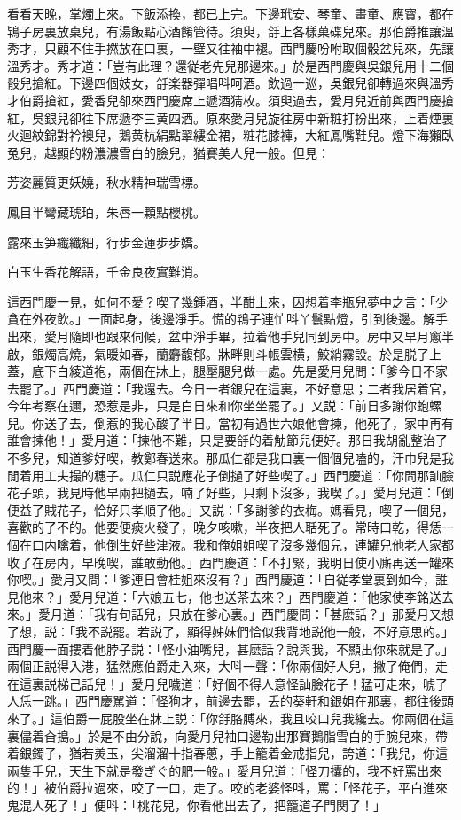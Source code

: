 看看天晚，掌燭上來。下飯添換，都已上完。下邊玳安、琴童、畫童、應寳，都在鴇子房裏放桌兒，有湯飯點心酒餚管待。須臾，㧱上各樣菓碟兒來。那伯爵推讓溫秀才，只顧不住手撚放在口裏，一壁又往袖中褪。西門慶吩咐取個骰盆兒來，先讓溫秀才。秀才道：「豈有此理？還従老先兒那邊來。」於是西門慶與吳銀兒用十二個骰兒搶紅。下邊四個妓女，㧱楽器彈唱呌呵酒。飲過一巡，吳銀兒卻轉過來與溫秀才伯爵搶紅，愛香兒卻來西門慶席上遞酒猜枚。須臾過去，愛月兒近前與西門慶搶紅，吳銀兒卻往下席遞李三黄四酒。原來愛月兒旋往房中新粧打扮出來，上着煙裏火迴紋錦對衿襖兒，鵝黄杭絹點翠縷金裙，粧花膝褲，大紅鳳嘴鞋兒。燈下海獺臥兔兒，越顯的粉濃濃雪白的臉兒，猶賽美人兒一般。但見：

\begin{myquote}
芳姿麗質更妖嬈，秋水精神瑞雪標。

鳳目半彎藏琥珀，朱唇一顆點櫻桃。

露來玉笋纖纖細，行步金蓮步步嬌。

白玉生香花解語，千金良夜實難消。
\end{myquote}

這西門慶一見，如何不愛？喫了幾鍾酒，半酣上來，因想着李瓶兒夢中之言：「少貪在外夜飲。」一面起身，後邊淨手。慌的鴇子連忙呌丫鬟點燈，引到後邊。解手出來，愛月隨即也跟來伺候，盆中淨手畢，拉着他手兒同到房中。房中又早月窻半啟，銀燭高燒，氣暖如春，蘭麝馥郁。牀畔則斗帳雲横，鮫綃霧設。於是脱了上蓋，底下白綾道袍，兩個在牀上，腿壓腿兒做一處。先是愛月兒問：「爹今日不家去罷了。」西門慶道：「我還去。今日一者銀兒在這裏，不好意思；二者我居着官，今年考察在邇，恐惹是非，只是白日來和你坐坐罷了。」又説：「前日多謝你蚫螺兒。你送了去，倒惹的我心酸了半日。當初有過世六娘他會揀，他死了，家中再有誰會揀他！」愛月道：「揀他不難，只是要㧱的着觔節兒便好。那日我胡亂整治了不多兒，知道爹好喫，教鄭春送來。那瓜仁都是我口裏一個個兒嗑的，汗巾兒是我閒着用工夫撮的穗子。瓜仁只説應花子倒撾了好些喫了。」西門慶道：「你問那訕臉花子頭，我見時他早兩把撾去，喃了好些，只剩下沒多，我喫了。」愛月兒道：「倒便益了賊花子，恰好只孝順了他。」又説：「多謝爹的衣梅。媽看見，喫了一個兒，喜歡的了不的。他要便痰火發了，晚夕咳嗽，半夜把人聒死了。常時口乾，得恁一個在口内噙着，他倒生好些津液。我和俺姐姐喫了沒多幾個兒，連罐兒他老人家都收了在房内，早晚喫，誰敢動他。」西門慶道：「不打緊，我明日使小廝再送一罐來你喫。」愛月又問：「爹連日會桂姐來沒有？」西門慶道：「自従孝堂裏到如今，誰見他來？」愛月兒道：「六娘五七，他也送茶去來？」西門慶道：「他家使李銘送去來。」愛月道：「我有句話兒，只放在爹心裏。」西門慶問：「甚麽話？」那愛月又想了想，説：「我不説罷。若説了，顯得姊妹們恰似我背地説他一般，不好意思的。」西門慶一面摟着他脖子説：「怪小油嘴兒，甚麽話？說與我，不顯出你來就是了。」　兩個正説得入港，猛然應伯爵走入來，大呌一聲：「你兩個好人兒，撇了俺們，走在這裏説梯己話兒！」愛月兒噦道：「好個不得人意怪訕臉花子！猛可走來，唬了人恁一跳。」西門慶駡道：「怪狗才，前邊去罷，丢的葵軒和銀姐在那裏，都往後頭來了。」這伯爵一屁股坐在牀上説：「你㧱胳膊來，我且咬口兒我纔去。你兩個在這裏儘着㒲搗。」於是不由分說，向愛月兒袖口邊勒出那賽鵝脂雪白的手腕兒來，帶着銀鐲子，猶若羙玉，尖溜溜十指春蔥，手上籠着金戒指兒，誇道：「我兒，你這兩隻手兒，天生下就是發ぎぐ的肥一般。」愛月兒道：「怪刀攮的，我不好罵出來的！」被伯爵拉過來，咬了一口，走了。咬的老婆怪呌，罵：「怪花子，平白進來鬼混人死了！」便呌：「桃花兒，你看他出去了，把籠道子門関了！」


